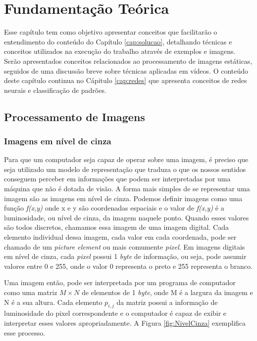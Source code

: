 \chapter{Fundamentação Teórica}\label{cap:fundament}



Esse capítulo tem como objetivo apresentar conceitos que facilitarão o entendimento do conteúdo do Capítulo \ref{cap:solucao}, detalhando técnicas e conceitos utilizados na execução do trabalho através de exemplos e imagens. Serão apresentados conceitos relacionados ao processamento de imagens estáticas, seguidos de uma discussão breve sobre técnicas aplicadas em vídeos. O conteúdo deste capítulo continua no Cápitulo \ref{cap:redes} que apresenta conceitos de redes neurais e classificação de padrões. 

\section{Processamento de Imagens}\label{sec:processamento}

\subsection{Imagens em nível de cinza}

Para que um computador seja capaz de operar sobre uma imagem, é preciso que seja utilizado um modelo de representação que traduza o que os nossos sentidos conseguem perceber em informações que podem ser interpretadas por uma máquina que não é dotada de visão. A forma mais simples de se representar uma imagem são as imagens em nível de cinza. Podemos definir imagens como uma função \textit{f{(x,y)}} onde x e y são coordenadas espaciais e o valor de  \textit{f{(x,y)}} é a luminosidade, ou nível de cinza, da imagem naquele ponto. Quando esses valores são todos discretos, chamamos essa imagem de uma imagem digital\cite{gonzalez2009digital}. Cada elemento individual dessa imagem, cada valor em cada coordenada, pode ser chamado de um \textit{picture element} ou mais comumente \textit{pixel}. Em imagens digitais em nível de cinza, cada \textit{pixel} possui 1 \textit{byte} de informação, ou seja, pode assumir valores entre 0 e 255, onde o valor 0 representa o preto e 255 representa o branco. 

Uma imagem então, pode ser interpretada por um programa de computador como uma matriz $M\times N$ de elementos de 1 \textit{byte}, onde M é a largura da imagem e N é a sua altura. Cada elemento $p_{i,j}$ da matriz possui a informação de luminosidade do pixel correspondente e o computador é capaz de exibir e interpretar esses valores apropriadamente. A Figura \ref{fig:NivelCinza} exemplifica esse processo.

